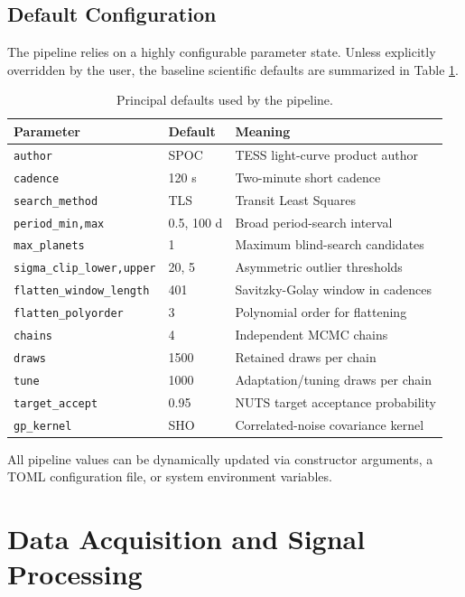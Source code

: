\documentclass[12pt,a4paper,oneside]{report}
\newcommand{\code}[1]{\texttt{\small #1}}
\begin{document}
\section{Default Configuration}
The pipeline relies on a highly configurable parameter state. Unless explicitly overridden by the user, the baseline scientific defaults are summarized in Table \ref{tab:defaults}.

\begin{longtable}{p{}p{}p{}}
\caption{Principal defaults used by the pipeline.}\label{tab:defaults}\\
\toprule
Parameter & Default & Meaning\\
\midrule
\code{author} & SPOC & TESS light-curve product author\\
\code{cadence} & 120 s & Two-minute short cadence\\
\code{search\_method} & TLS & Transit Least Squares \cite{hippke2019}\\
\code{period\_min,max} & 0.5, 100 d & Broad period-search interval\\
\code{max\_planets} & 1 & Maximum blind-search candidates\\
\code{sigma\_clip\_lower,upper} & 20, 5 & Asymmetric outlier thresholds\\
\code{flatten\_window\_length} & 401 & Savitzky-Golay window in cadences\\
\code{flatten\_polyorder} & 3 & Polynomial order for flattening\\
\code{chains} & 4 & Independent MCMC chains\\
\code{draws} & 1500 & Retained draws per chain\\
\code{tune} & 1000 & Adaptation/tuning draws per chain\\
\code{target\_accept} & 0.95 & NUTS target acceptance probability\\
\code{gp\_kernel} & SHO & Correlated-noise covariance kernel\\
\bottomrule
\end{longtable}

All pipeline values can be dynamically updated via constructor arguments, a TOML configuration file, or system environment variables.

\chapter{Data Acquisition and Signal Processing}
\end{document}
